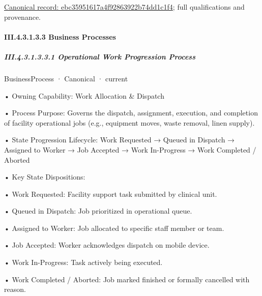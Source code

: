 {\footnotesize \href{../../../../continuum/business/business-function/ebc35951617a4f92863922b74dd1c1f4.md}{Canonical record: ebc35951617a4f92863922b74dd1c1f4}; full qualifications and provenance.}\par
\paragraph*{III.4.3.1.3.3 Business Processes}
\label{navigation:III.4.3.1.3.3}

\subparagraph*{III.4.3.1.3.3.1 Operational Work Progression Process}
\label{navigation:III.4.3.1.3.3.1}

\label{element:5ebba522194b4de5a5b3963e855d712d}
{\small BusinessProcess · Canonical · current}\par

•
Owning Capability: Work Allocation \& Dispatch



•
Process Purpose: Governs the dispatch, assignment, execution, and completion of facility operational jobs (e.g., equipment moves, waste removal, linen supply).



•
State Progression Lifecycle: Work Requested → Queued in Dispatch → Assigned to Worker → Job Accepted → Work In-Progress → Work Completed / Aborted



•
Key State Dispositions:



•
Work Requested: Facility support task submitted by clinical unit.



•
Queued in Dispatch: Job prioritized in operational queue.



•
Assigned to Worker: Job allocated to specific staff member or team.



•
Job Accepted: Worker acknowledges dispatch on mobile device.



•
Work In-Progress: Task actively being executed.



•
Work Completed / Aborted: Job marked finished or formally cancelled with reason.



